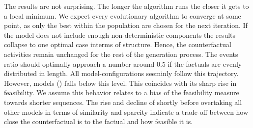\documentclass[./../../paper.tex]{subfiles}
\begin{document}
The results are not surprising. The longer the algorithm runs the closer it gets to a local minimum. 
We expect every evolutionary algorithm to converge at some point, as only the best within the population are chosen for the next iteration. If the model does not include enough non-deterministic components the results collapse to one optimal case interms of structure. Hence, the counterfactual activities remain unchanged for the rest of the generation process. 
The events ratio should optimally approach a number around 0.5 if the factuals are evenly distributed in length. All model-configurations seeminly follow this trajectory. 
However, models () falls below this level. This coincides with its sharp rise in feasibility. We assume this behavior relates to a bias of the feasibility measure towards shorter sequences.
The rise and decline of  shortly before overtaking all other models in terms of similarity and sparcity indicate a trade-off between how close the counterfactual is to the factual and how feasible it is.     



\end{document}
